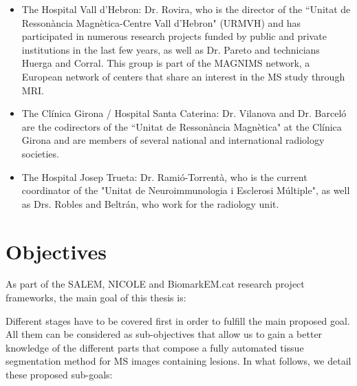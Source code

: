 \begin{itemize}

\item The Hospital Vall d'Hebron: Dr. Rovira, who is the director of the ``Unitat de Resson\`{a}ncia Magn\`{e}tica-Centre Vall d'Hebron" (URMVH) and has participated in numerous research projects funded by public and private institutions in the last few years, as well as Dr. Pareto and technicians Huerga and Corral. This group is part of the MAGNIMS network, a European network of centers that share an interest in the MS study through MRI.
 
	 \item The Cl\'{i}nica Girona / Hospital Santa Caterina: Dr. Vilanova and Dr. Barcel\'{o} are the codirectors of the ``Unitat de Resson\`{a}ncia Magn\`{e}tica" at the Cl\'{i}nica Girona and are members of several national and international radiology societies.
 
	\item The Hospital Josep Trueta: Dr. Rami\'{o}-Torrent\`{a}, who is the current coordinator of the "Unitat de Neuroimmunologia i Esclerosi M\'{u}ltiple", as well as Drs. Robles and Beltr\'{a}n, who work for the radiology unit.

\end{itemize}

\section{Objectives}
\label{sec:objectives}

As part of the SALEM, NICOLE and BiomarkEM.cat research project frameworks, the main goal of this thesis is: 

\begin{center}
\end{center}

Different stages have to be covered first in order to fulfill the main proposed goal. All them can be considered as sub-objectives that allow us to gain a better knowledge of the different parts that compose a fully automated tissue segmentation method for MS images containing lesions. In what follows, we detail these proposed sub-goals: 

